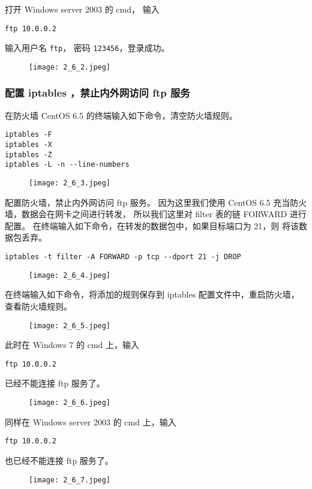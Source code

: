 打开 Windows server 2003 的 cmd，
输入
\begin{verbatim}
ftp 10.0.0.2
\end{verbatim}
输入用户名 \texttt{ftp}，
密码 \texttt{123456}，登录成功。
\begin{figure}[H]
  \begin{center}
    \texttt{[image: 2\_6\_2.jpeg]}
  \end{center}
\end{figure}
%
\subsubsection{配置 iptables ，禁止内外网访问 ftp 服务}
在防火墙 CentOS 6.5 的终端输入如下命令，清空防火墙规则。
\begin{verbatim}
iptables -F
iptables -X
iptables -Z
iptables -L -n --line-numbers
\end{verbatim}
\begin{figure}[H]
  \begin{center}
    \texttt{[image: 2\_6\_3.jpeg]}
  \end{center}
\end{figure}

配置防火墙，禁止内外网访问 ftp 服务。
因为这里我们使用 CentOS 6.5 充当防火墙，数据会在网卡之间进行转发，
所以我们这里对 filter 表的链 FORWARD 进行配置。
在终端输入如下命令，在转发的数据包中，如果目标端口为 21，则
将该数据包丢弃。
\begin{verbatim}
iptables -t filter -A FORWARD -p tcp --dport 21 -j DROP
\end{verbatim}
\begin{figure}[H]
  \begin{center}
    \texttt{[image: 2\_6\_4.jpeg]}
  \end{center}
\end{figure}

在终端输入如下命令，将添加的规则保存到 iptables 配置文件中，重启防火墙，
查看防火墙规则。
\begin{figure}[H]
  \begin{center}
    \texttt{[image: 2\_6\_5.jpeg]}
  \end{center}
\end{figure}

此时在 Windows 7 的 cmd 上，输入
\begin{verbatim}
ftp 10.0.0.2
\end{verbatim}
已经不能连接 ftp 服务了。
\begin{figure}[H]
  \begin{center}
    \texttt{[image: 2\_6\_6.jpeg]}
  \end{center}
\end{figure}

同样在 Windows server 2003 的 cmd 上，输入
\begin{verbatim}
ftp 10.0.0.2
\end{verbatim}
也已经不能连接 ftp 服务了。
\begin{figure}[H]
  \begin{center}
    \texttt{[image: 2\_6\_7.jpeg]}
  \end{center}
\end{figure}
%
